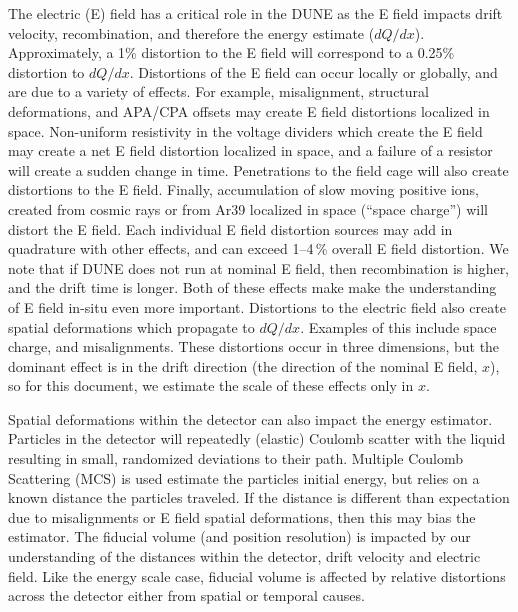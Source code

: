 The electric (E) field  has a critical role in the DUNE as the E field impacts drift velocity, recombination, and therefore the energy estimate ($dQ/dx$). Approximately, a \num{1}\% distortion to the E field will correspond to a \num{0.25}\% distortion to $dQ/dx$. Distortions of the E field can occur locally or globally, and are due to a variety of effects. For example,  misalignment,   structural deformations, and APA/CPA offsets  may create E field distortions localized in space. Non-uniform resistivity in the voltage dividers which create the E field may create a net E field distortion localized in space, and a failure of a resistor will create a sudden change in time. Penetrations to the field cage will also create distortions to the E field. Finally, accumulation of slow moving positive ions, created from cosmic rays or from Ar39 localized in space (``space charge'') will distort the E field. Each individual E field distortion sources may add in quadrature with other effects, and can exceed \numrange{1}{4}\,\% overall E field distortion.
We note that if DUNE does not run at nominal E field, then recombination is higher, and the drift time is longer. Both of these effects make   make the understanding of E field in-situ even more important. Distortions to the electric field also create spatial deformations which propagate to $dQ/dx$. Examples of this include space charge, and misalignments. These distortions occur in three dimensions, but the dominant effect is in the drift direction (the direction of the nominal E field, $x$), so for this document, we estimate the scale of these effects only in $x$.

Spatial deformations within the detector  can also impact the energy estimator. Particles in the detector will repeatedly (elastic) Coulomb scatter with the liquid resulting in small, randomized deviations to their path. Multiple Coulomb Scattering (MCS) is used estimate the particles initial energy, but relies on a known distance the particles traveled. If the  distance is different than expectation due to misalignments or E field spatial deformations, then this may bias the estimator. %
The fiducial volume (and position resolution) is impacted by our understanding of the distances within the detector, drift velocity and electric field. Like the energy scale case, fiducial volume is affected by relative distortions across the detector either from spatial or temporal causes.

